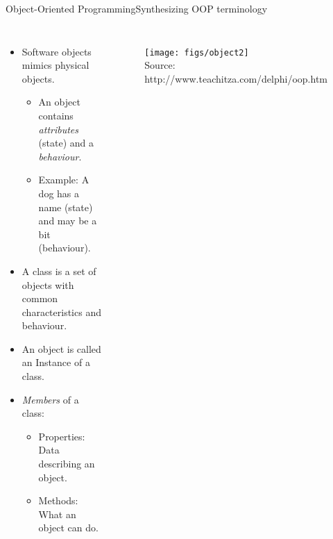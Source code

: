 \documentclass[10pt,compress]{beamer} %
\begin{document}
\begin{frame}{Object-Oriented Programming}{Synthesizing OOP terminology}
    \begin{columns}
 		  \begin{itemize}
			\item \small{Software objects mimics physical objects.} %
		   	\begin{itemize}
				\item \footnotesize{An object contains \textit{attributes} (state) and a \textit{behaviour}}. %
				\item \footnotesize{Example: A dog has a name (state) and may be a bit (behaviour).}
		  	\end{itemize}
		  	\item \small{A \alert{class} is a set of objects with common characteristics and behaviour.}
		  	\item \small{An \alert{object} is called an \alert{Instance} of a class.}
			\item \textit{Members} of a class:
		    	\begin{itemize}
				\item \footnotesize{\alert{Properties}: Data describing an object.}
				\item \footnotesize{\alert{Methods}: What an object can do.}%
		  	    \end{itemize}
		  \end{itemize}
	  	 	\begin{figure}[t]
			\begin{center}
			    \texttt{[image: figs/object2]}\\
				\tiny{Source: http://www.teachitza.com/delphi/oop.htm}
			\end{center}
  	 		\end{figure}
    \end{columns}
\end{frame}


\end{document}
